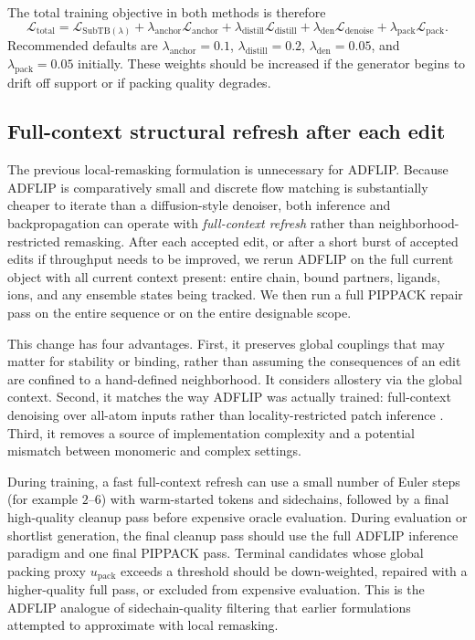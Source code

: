 \documentclass[11pt]{article}
\newcommand{\SubTB}{\ensuremath{\mathrm{SubTB}}}
\newcommand{\packunc}{\ensuremath{u_{\mathrm{pack}}}}
\begin{document}
The total training objective in both methods is therefore
\begin{equation}
\label{eq:totalloss}
    \mathcal{L}_{\mathrm{total}}=\mathcal{L}_{\SubTB(\lambda)}+\lambda_{\mathrm{anchor}}\mathcal{L}_{\mathrm{anchor}}+\lambda_{\mathrm{distill}}\mathcal{L}_{\mathrm{distill}}+\lambda_{\mathrm{den}}\mathcal{L}_{\mathrm{denoise}}+\lambda_{\mathrm{pack}}\mathcal{L}_{\mathrm{pack}}.
\end{equation}
Recommended defaults are $\lambda_{\mathrm{anchor}}=0.1$, $\lambda_{\mathrm{distill}}=0.2$, $\lambda_{\mathrm{den}}=0.05$, and $\lambda_{\mathrm{pack}}=0.05$ initially. These weights should be increased if the generator begins to drift off support or if packing quality degrades.


\subsection{Full-context structural refresh after each edit}

The previous local-remasking formulation is unnecessary for ADFLIP. Because ADFLIP is comparatively small and discrete flow matching is substantially cheaper to iterate than a diffusion-style denoiser, both inference and backpropagation can operate with \emph{full-context refresh} rather than neighborhood-restricted remasking. After each accepted edit, or after a short burst of accepted edits if throughput needs to be improved, we rerun ADFLIP on the full current object with all current context present: entire chain, bound partners, ligands, ions, and any ensemble states being tracked. We then run a full PIPPACK repair pass on the entire sequence or on the entire designable scope.

This change has four advantages. First, it preserves global couplings that may matter for stability or binding, rather than assuming the consequences of an edit are confined to a hand-defined neighborhood. It considers allostery via the global context. Second, it matches the way ADFLIP was actually trained: full-context denoising over all-atom inputs rather than locality-restricted patch inference \citep{yi2025adflip}. Third, it removes a source of implementation complexity and a potential mismatch between monomeric and complex settings.

During training, a fast full-context refresh can use a small number of Euler steps (for example $2$--$6$) with warm-started tokens and sidechains, followed by a final high-quality cleanup pass before expensive oracle evaluation. During evaluation or shortlist generation, the final cleanup pass should use the full ADFLIP inference paradigm and one final PIPPACK pass. Terminal candidates whose global packing proxy \packunc{} exceeds a threshold should be down-weighted, repaired with a higher-quality full pass, or excluded from expensive evaluation. This is the ADFLIP analogue of sidechain-quality filtering that earlier formulations attempted to approximate with local remasking.
\end{document}
